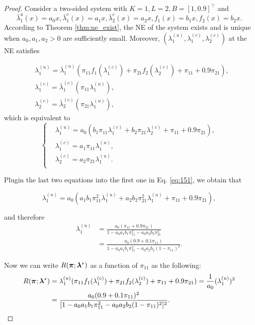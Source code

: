 \begin{proof}
Consider a two-sided system with $K=1, L=2, B=[1, 0.9]^{\top}$ and $$\bar{\lambda}^{{u}}_1(x)=a_0x,\bar{\lambda}^{{c}}_1(x)=a_1x,\bar{\lambda}^{{c}}_2(x)=a_2x, f_1(x)=b_1x,f_2(x)=b_2x.$$ According to Theorem \ref{thm:ne_exist}, the NE of the system exists and is unique when $a_0, a_1, a_2>0$ are sufficiently small. Moreover, $(\lambda^{(u)}_1,\lambda^{(c)}_1,\lambda^{(c)}_2)$ at the NE satisfies

\begin{align*}
    & \lambda^{(u)}_1=\bar{\lambda}^{{(u)}}_1(\pi_{11}f_1(\lambda^{(c)}_1)+\pi_{21}f_2(\lambda^{(c)}_2)+\pi_{11}+0.9\pi_{21}), \\ 
    & \lambda^{(c)}_1=\bar{\lambda}^{(c)}_1(\pi_{11}\lambda^{(u)}_1), \\
    & \lambda^{(c)}_2=\bar{\lambda}^{(c)}_2(\pi_{21}\lambda^{(u)}_1),
\end{align*}
which is equivalent to
\begin{equation}\label{eq:151}
\begin{cases} 
& \lambda^{(u)}_1=a_0(b_1\pi_{11}\lambda^{(c)}_1+b_2\pi_{21}\lambda^{(c)}_2+\pi_{11}+0.9\pi_{21}), \\
& \lambda^{(c)}_1=a_1 \pi_{11}\lambda^{(u)}_1, \\ 
& \lambda^{(c)}_2=a_2 \pi_{21}\lambda^{(u)}_1.\\ 
\end{cases}
\end{equation}

Plugin the last two equations into the first one in Eq. \eqref{eq:151}, we obtain that 

$$\lambda^{(u)}_1=a_0(a_1b_1\pi^2_{11}\lambda^{(u)}_1+a_2b_2\pi^2_{21}\lambda^{(u)}_1+\pi_{11}+0.9\pi_{21}),$$

and therefore 
\begin{align*}
\lambda^{(u)}_1&=\frac{a_0(\pi_{11}+0.9\pi_{21})}{1-a_0a_1b_1\pi^2_{11}-a_0a_2b_2\pi^2_{21}}   \\ 
&=\frac{a_0(0.9+0.1\pi_{11})}{1-a_0a_1b_1\pi^2_{11}-a_0a_2b_2(1-\pi_{11})^2}.
\end{align*}

Now we can write $R(\bm{\pi};\bm{\lambda}^*)$ as a function of $\pi_{11}$ as the following:
\begin{align*}
R(\bm{\pi};\bm{\lambda}^*)&=\lambda^{(u)}_1(\pi_{11}f_1(\lambda^{(c)}_1)+\pi_{21}f_2(\lambda^{(c)}_2)+\pi_{11}+0.9\pi_{21})=\frac{1}{a_0}(\lambda_1^{(u)})^2 \\ 
&= \frac{a_0(0.9+0.1\pi_{11})^2}{[1-a_0a_1b_1\pi^2_{11}-a_0a_2b_2(1-\pi_{11})^2]^2}.
\end{align*}


\end{proof}
